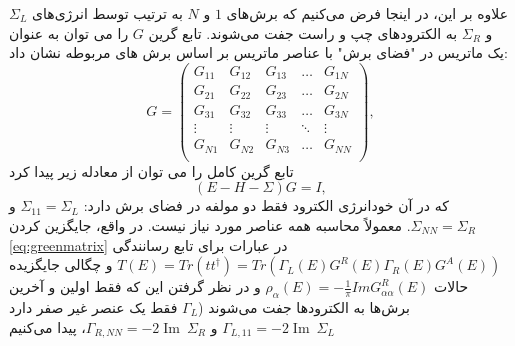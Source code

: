 علاوه بر این، در اینجا فرض می‌کنیم که برش‌های $1$ و $N$ به ترتیب توسط انرژی‌های $\Sigma_L$ و $\Sigma_R$ به الکترودهای چپ و راست جفت می‌شوند.
تابع گرین $G$ را می توان به عنوان یک ماتریس در "فضای برش" با عناصر ماتریس بر اساس برش های مربوطه نشان داد:
\begin{equation}
    G=\left( \begin{matrix}
           {{G}_{11}} & {{G}_{12}} & {{G}_{13}} & \ldots  & {{G}_{1N}}  \\
           {{G}_{21}} & {{G}_{22}} & {{G}_{23}} & \ldots  & {{G}_{2N}}  \\
           {{G}_{31}} & {{G}_{32}} & {{G}_{33}} & \ldots  & {{G}_{3N}}  \\
           \vdots  & \vdots  & \vdots  & \ddots  & \vdots   \\
           {{G}_{N1}} & {{G}_{N2}} & {{G}_{N3}} & \ldots  & {{G}_{NN}}  \\
        \end{matrix} \right),
        \label{eq:greenmatrix}
\end{equation}
تابع گرین کامل را می توان از معادله زیر پیدا کرد
\begin{equation}
    \left( E-H-\Sigma\right) G=I,
\end{equation}
که در آن خودانرژی الکترود فقط دو مولفه در فضای برش دارد: $\Sigma_{11} = \Sigma_{L}$ و $\Sigma_{NN} = \Sigma_{R}$.
معمولاً محاسبه همه عناصر مورد نیاز نیست. در واقع، جایگزین کردن \ref{eq:greenmatrix} در عبارات برای تابع رسانندگی $T(E) = Tr(tt^{\dagger}) = Tr(\Gamma_L(E)G^R(E)\Gamma_R(E) G^A(E))$ و چگالی جایگزیده حالات $\rho_{\alpha}(E) = -\frac{1}{\pi}Im G^R_{\alpha\alpha}(E)$ و در نظر گرفتن این که فقط اولین و آخرین برش‌ها به الکترودها جفت می‌شوند ($\Gamma_{L}$ فقط یک عنصر غیر صفر دارد ${{\Gamma }_{L,11}}=-2\operatorname{Im}\ {{\Sigma }_{L}}$ و ${{\Gamma }_{R,NN}}=-2\operatorname{Im}\ {{\Sigma }_{R}}$، پیدا می‌کنیم 
